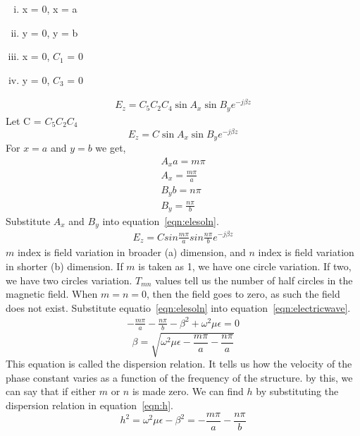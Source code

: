 \begin{enumerate}[(i)]
\item x = 0, x = a
\item y = 0, y = b
\item x = 0, $ C_{1} $ = 0
\item y = 0, $ C_{3} $ = 0
\end{enumerate}     
\begin{align*}
E_{z} = C_{5}C_{2}C_{4}\sin A_{x}\sin B_{y} e^{-j\beta z}
\end{align*}
Let C = $ C_{5}C_{2}C_{4} $
\begin{equation}
E_{z} = C\sin A_{x}\sin B_y e^{-j\beta z}
\label{eqn:elesoln}
\end{equation}
For $x = a$ and $y = b$ we get,
\begin{align*}
A_xa = m\pi\\
A_x = \frac{m\pi}{a}\\
B_yb = n\pi\\
B_y = \frac{n\pi}{b}
\end{align*}
Substitute $A_x$ and $B_y$ into equation~\ref{eqn:elesoln}.
\begin{align*}
E_{z} = C sin\frac{m\pi}{a} sin\frac{n\pi}{b} e^{-j\beta z}
\end{align*}
$m$ index is field variation in broader (a) dimension, and $n$ index is field variation in shorter (b) dimension. If $m$ is taken as 1, we have one circle variation. If two, we have two circles variation. $T_{mn}$ values tell us the number of half circles in the magnetic field. When $m = n = 0$, then the field goes to zero, as such the field does not exist. Substitute equatio~\ref{eqn:elesoln} into equation~\ref{eqn:electricwave}.
\begin{align*}
-\frac{m\pi}{a} - \frac{n\pi}{b} - \beta^{2} + {\omega^2\mu\epsilon} = 0
\end{align*}
\begin{equation}
\beta = \sqrt{{\omega^2\mu\epsilon} - \frac{m\pi}{a} - \frac{n\pi}{a}}
\label{eqn:dispersionrelatn}
\end{equation}
This equation is called the dispersion relation. It tells us how the velocity of the phase constant varies as a function of the frequency of the structure. by this, we can say that if either $m$ or $n$ is made zero. We can find $h$ by substituting the dispersion relation in equation~\ref{eqn:h}.
\begin{dmath*}
h^{2} = \omega^2\mu\epsilon - \beta^{2} = -\frac{m\pi}{a} - \frac{n\pi}{b}
\end{dmath*} 

